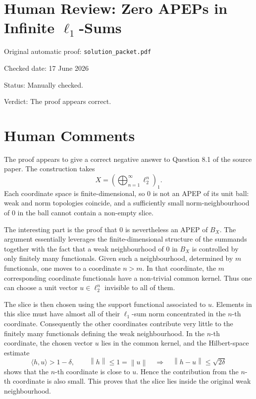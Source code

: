 \documentclass[11pt]{article}
\newcommand{\norm}[1]{\left\lVert #1 \right\rVert}
\begin{document}
\section*{Human Review: Zero APEPs in Infinite \texorpdfstring{$\ell_1$}{ell-1}-Sums}

\noindent Original automatic proof: \texttt{solution\_packet.pdf}

\noindent Checked date: 17 June 2026

\noindent Status: Manually checked.

\noindent Verdict: The proof appears correct.

\section*{Human Comments}

The proof appears to give a correct negative answer to Question 8.1 of the source paper. The construction takes
\[
  X=\left(\bigoplus_{n=1}^\infty \ell_2^n\right)_1.
\]
Each coordinate space is finite-dimensional, so \(0\) is not an APEP of its unit ball: weak and norm topologies coincide, and a sufficiently small norm-neighbourhood of \(0\) in the ball cannot contain a non-empty slice.

The interesting part is the proof that \(0\) is nevertheless an APEP of \(B_X\). The argument essentially leverages the finite-dimensional structure of the summands together with the fact that a weak neighbourhood of \(0\) in \(B_X\) is controlled by only finitely many functionals. Given such a neighbourhood, determined by \(m\) functionals, one moves to a coordinate \(n>m\). In that coordinate, the \(m\) corresponding coordinate functionals have a non-trivial common kernel. Thus one can choose a unit vector \(u\in \ell_2^n\) invisible to all of them.

The slice is then chosen using the support functional associated to \(u\). Elements in this slice must have almost all of their \(\ell_1\)-sum norm concentrated in the \(n\)-th coordinate. Consequently the other coordinates contribute very little to the finitely many functionals defining the weak neighbourhood. In the \(n\)-th coordinate, the chosen vector \(u\) lies in the common kernel, and the Hilbert-space estimate
\[
  \langle h,u\rangle>1-\delta,\qquad \norm{h}\leq 1=\norm{u}
  \quad\Longrightarrow\quad
  \norm{h-u}\leq \sqrt{2\delta}
\]
shows that the \(n\)-th coordinate is close to \(u\). Hence the contribution from the \(n\)-th coordinate is also small. This proves that the slice lies inside the original weak neighbourhood.
\end{document}
